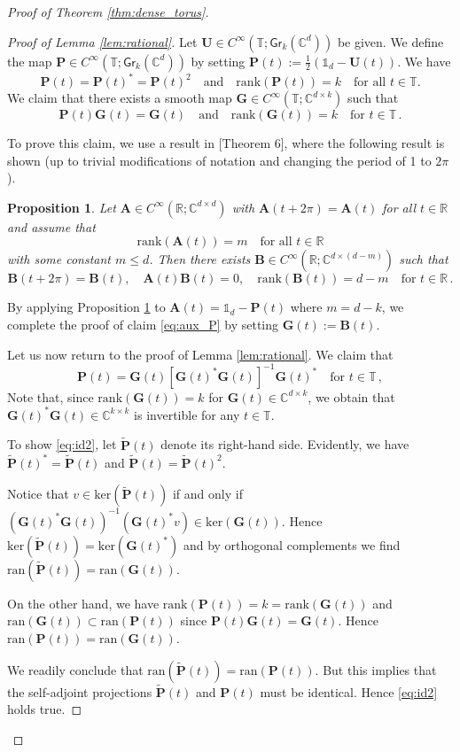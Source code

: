\documentclass[11pt,reqno]{amsart}
\newtheorem{prop}{Proposition}[section]
\theoremstyle{definition}
\theoremstyle{remark}
\theoremstyle{remark}
\numberwithin{equation}{section}
\newcommand{\C}{\mathbb{C}}
\newcommand{\R}{\mathbb{R}}
\newcommand{\T}{\mathbb{T}}
\newcommand{\ran}{\mathrm{ran}}
\renewcommand{\ker}{\mathrm{ker}}
\newcommand{\rank}{\mathrm{rank}}
\newcommand{\be}{\begin{equation}}
\newcommand{\ee}{\end{equation}}
\newcommand{\Ab}{\mathbf{A}}
\newcommand{\Bb}{\mathbf{B}}
\newcommand{\Ub}{\mathbf{U}}
\newcommand{\Pb}{\mathbf{P}}
\newcommand{\Gb}{\mathbf{G}}
\newcommand{\Gr}{\mathsf{Gr}}
\begin{document}
\begin{appendix}
\begin{proof}[Proof of Theorem \ref{thm:dense_torus}]
\begin{proof}[Proof of Lemma \ref{lem:rational}]
Let $\Ub \in C^\infty(\T; \Gr_k(\C^d))$ be given. We define the map $\Pb \in C^\infty(\T; \Gr_k(\C^d))$ by setting $\Pb(t) := \frac{1}{2} (\mathds{1}_d - \Ub(t))$. We have 
$$
\Pb(t) = \Pb(t)^* = \Pb(t)^2 \quad \mbox{and} \quad \rank(\Pb(t)) = k \quad \mbox{for all $t \in \T$}.
$$
We claim that there exists a smooth map $\Gb \in C^\infty(\T; \C^{d \times k})$ such that
\be \label{eq:aux_P}
 \Pb(t) \Gb(t) = \Gb(t) \quad \mbox{and} \quad \rank(\Gb(t)) = k  \quad \mbox{for $t \in \T$} \, .
\ee

To prove this claim, we use a result in \cite{Si-65}[Theorem 6], where the following result is shown (up to trivial modifications of notation and changing the period of 1 to $2\pi$).
\begin{prop} \label{prop:sibuya}
Let $\Ab \in C^\infty(\R; \C^{d \times d})$ with $\Ab(t+2\pi) = \Ab(t)$ for all $t \in \R$ and assume that 
$$
\rank(\Ab(t)) = m \quad \mbox{for all $t \in \R$}
$$
with some constant $m \leq d$. Then there exists $\Bb \in C^\infty(\R; \C^{d \times (d-m)})$ such that
$$
\Bb(t+2 \pi) = \Bb(t), \quad \Ab(t) \Bb(t) = 0, \quad \rank(\Bb(t))=d-m \quad \mbox{for $t \in \R$} \, .
$$
\end{prop}
By applying Proposition \ref{prop:sibuya} to $\Ab(t) = \mathds{1}_d - \Pb(t)$ where $m=d-k$, we complete the proof of claim \eqref{eq:aux_P} by setting $\Gb(t) := \Bb(t)$.

Let us now return to the proof of Lemma \ref{lem:rational}. We claim that
\be \label{eq:id2}
\Pb(t) = \Gb(t) [\Gb(t)^* \Gb(t)]^{-1} \Gb(t)^* \quad \mbox{for $t \in \T$} \, ,
\ee
Note that, since $\rank(\Gb(t)) = k$ for $\Gb(t) \in \C^{d \times k}$, we obtain that $\Gb(t)^* \Gb(t) \in \C^{k \times k}$ is invertible for any $t \in \T$. 

To show \eqref{eq:id2}, let $\tilde{\Pb}(t)$ denote its right-hand side. Evidently, we have $\tilde{\Pb}(t)^* = \tilde{\Pb}(t)$ and $\tilde{\Pb}(t) = \tilde{\Pb}(t)^2$. 

Notice that $v \in \ker(\tilde{\Pb}(t))$ if and only if $(\Gb(t)^* \Gb(t))^{-1}(\Gb(t)^* v) \in \ker(\Gb(t))$. Hence $\ker(\tilde{\Pb}(t))=\ker(\Gb(t)^*)$ and by orthogonal complements we find $\ran(\tilde{\Pb}(t)) = \ran(\Gb(t))$. 

On the other hand, we have $\rank(\Pb(t))=k=\rank(\Gb(t))$ and $\ran(\Gb(t)) \subset \ran(\Pb(t))$ since $\Pb(t) \Gb(t) = \Gb(t)$. Hence $\ran(\Pb(t))=\ran(\Gb(t))$. 

We readily conclude that $\ran (\tilde{\Pb}(t)) = \ran(\Pb(t))$. But this implies that the self-adjoint projections $\tilde{\Pb}(t)$ and $\Pb(t)$ must be identical. Hence \eqref{eq:id2} holds true.


\end{proof}
\end{proof}
\end{appendix}
\end{document}
